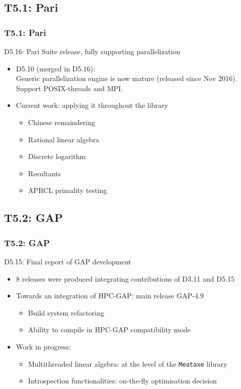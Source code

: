 \documentclass{beamer}
\begin{document}
\subsection{T5.1: Pari}
\begin{frame}
  \frametitle{T5.1: Pari}
  \begin{block} {D5.16: Pari Suite release, fully supporting parallelization}
    \begin{itemize}
    \item D5.10 (merged in D5.16):\\ Generic parallelization engine is now mature
      (released since Nov 2016). Support POSIX-threads and MPI.
    \item Current work: applying it throughout the library
      \begin{itemize}
      \item Chinese remaindering
      \item Rational linear algebra
      \item Discrete logarithm
      \item Resultants
      \item APRCL primality testing
      \end{itemize}
      
    \end{itemize}
  \end{block}
\end{frame}

\subsection{T5.2: GAP}
\begin{frame}
  \frametitle{T5.2: GAP}
  \begin{block} {D5.15: Final report of GAP development}
    \begin{itemize}
    \item 8 releases were produced integrating contributions of D3.11 and D5.15
    \item Towards an integration of HPC-GAP: main release GAP-4.9
      \begin{itemize}
      \item Build system refactoring
      \item Ability to compile in HPC-GAP compatibility mode
      \end{itemize}
    \item Work in progress:
      \begin{itemize}
      \item  Multithreaded linear algebra: at the level of the \texttt{Meataxe} library
      \item Introspection functionalities: on-the-fly optimisation decision
      \end{itemize}
    \end{itemize}
  \end{block}
\end{frame}
\end{document}
